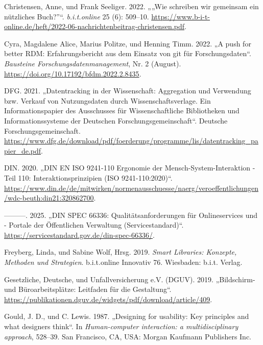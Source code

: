 \documentclass[
  11pt,
  letterpaper,
  DIV=11,
  twoside]{scrreprt}
\newlength{\cslhangindent}
\newenvironment{CSLReferences}[2] %
 {\begin{list}{}{%
  \setlength{\itemindent}{0pt}
  \setlength{\leftmargin}{0pt}
  \setlength{\parsep}{0pt}
  \ifodd #1
   \setlength{\leftmargin}{\cslhangindent}
   \setlength{\itemindent}{-1\cslhangindent}
  \fi
  \setlength{\itemsep}{#2\baselineskip}}}
 {\end{list}}
\begin{document}
\begin{CSLReferences}{1}{0}
Christensen, Anne, und Frank Seeliger. 2022. {„„Wie schreiben wir
gemeinsam ein nützliches Buch?''``}. \emph{b.i.t.online} 25 (6):
509--10.
\url{https://www.b-i-t-online.de/heft/2022-06-nachrichtenbeitrag-christensen.pdf}.

Cyra, Magdalene Alice, Marius Politze, und Henning Timm. 2022. {„A push
for better {RDM}: Erfahrungsbericht aus dem Einsatz von git für
Forschungsdaten``}. \emph{Bausteine Forschungsdatenmanagement}, Nr. 2
(August). \url{https://doi.org/10.17192/bfdm.2022.2.8435}.

DFG. 2021. {„Datentracking in der Wissenschaft: Aggregation und
Verwendung bzw. Verkauf von Nutzungsdaten durch Wissenschaftsverlage.
Ein Informationspapier des Ausschusses für Wissenschaftliche
Bibliotheken und Informationssysteme der Deutschen
Forschungsgemeinschaft``}. Deutsche Forschungsgemeinschaft.
\url{https://www.dfg.de/download/pdf/foerderung/programme/lis/datentracking_papier_de.pdf}.

DIN. 2020. {„{DIN} {EN} {ISO} 9241-110 Ergonomie der
Mensch-System-Interaktion - Teil 110: Interaktionsprinzipien ({ISO}
9241-110:2020)``}.
\url{https://www.din.de/de/mitwirken/normenausschuesse/naerg/veroeffentlichungen/wdc-beuth:din21:320862700}.

---------. 2025. {„{DIN} {SPEC} 66336: Qualitätsanforderungen für
Onlineservices und - Portale der Öffentlichen Verwaltung
(Servicestandard)``}.
\url{https://servicestandard.gov.de/din-spec-66336/}.

Freyberg, Linda, und Sabine Wolf, Hrsg. 2019. \emph{Smart Libraries:
Konzepte, Methoden und Strategien}. b.i.t.online Innovativ 76.
Wiesbaden: b.i.t. Verlag.

Gesetzliche, Deutsche, und Unfallversicherung e.V. (DGUV). 2019.
{„Bildschirm- und Büroarbeitsplätze: Leitfaden für die Gestaltung``}.
\url{https://publikationen.dguv.de/widgets/pdf/download/article/409}.

Gould, J. D., und C. Lewis. 1987. {„Designing for usability: Key
principles and what designers think``}. In \emph{Human-computer
interaction: a multidisciplinary approach}, 528--39. San Francisco,
{CA}, {USA}: Morgan Kaufmann Publishers Inc.


\end{CSLReferences}
\end{document}
